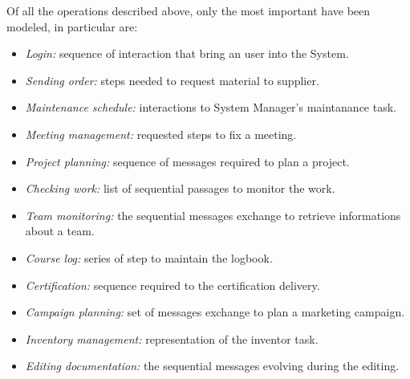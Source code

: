 Of all the operations described above, only the most important have been modeled, in particular are:
\begin{itemize}
 \item \textit{Login:} sequence of interaction that bring an user into the System.
 \item \textit{Sending order:} steps needed to request material to supplier.
 \item \textit{Maintenance schedule:} interactions to System Manager's maintanance task.
 \item \textit{Meeting management:} requested steps to fix a meeting.

 \item \textit{Project planning:} sequence of messages required to plan a project.
 \item \textit{Checking work:} list of sequential passages to monitor the work.
 \item \textit{Team monitoring:} the sequential messages exchange to retrieve informations about a team.

 \item \textit{Course log:} series of step to maintain the logbook.
 \item \textit{Certification:} sequence required to the certification delivery.

 \item \textit{Campaign planning:} set of messages exchange to plan a marketing campaign.

 \item \textit{Inventory management:} representation of the inventor task.

 \item \textit{Editing documentation:} the sequential messages evolving during the editing.
\end{itemize}





